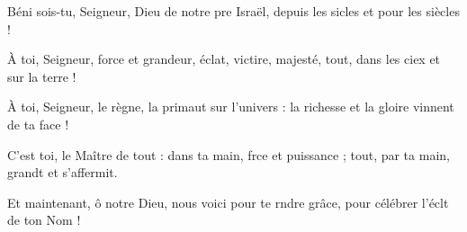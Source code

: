 \item Béni sois-tu, Seigneur,\pscross{} Dieu de notre pre Israël,\psstar{} depuis les sicles et pour les siècles ! 
\item À toi, Seigneur, force et grandeur,\pscross{} éclat, victire, majesté,\psstar{} tout, dans les ciex et sur la terre ! 
\item À toi, Seigneur, le règne,\pscross{} la primaut sur l’univers :\psstar{} la richesse et la gloire vinnent de ta face ! 
\item C’est toi, le Maître de tout :\pscross{} dans ta main, frce et puissance ;\psstar{} tout, par ta main, grandt et s’affermit. 
\item Et maintenant, ô notre Dieu,\pscross{} nous voici pour te rndre grâce,\psstar{} pour célébrer l’éclt de ton Nom !